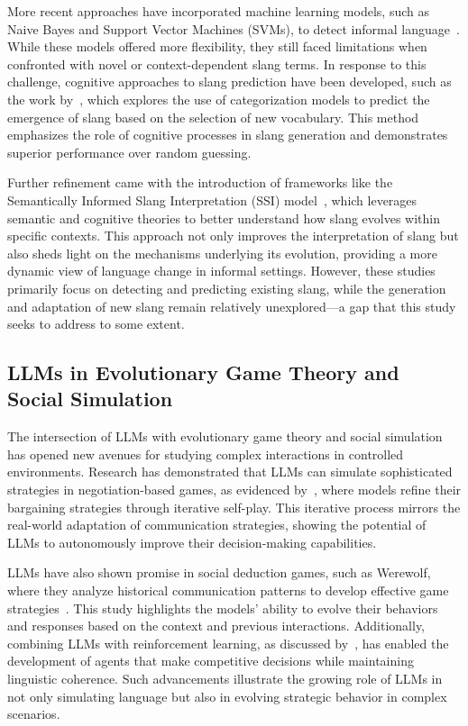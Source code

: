 More recent approaches have incorporated machine learning models, such as Naive Bayes and Support Vector Machines (SVMs), to detect informal language~\cite{10308036,9961254}. While these models offered more flexibility, they still faced limitations when confronted with novel or context-dependent slang terms. In response to this challenge, cognitive approaches to slang prediction have been developed, such as the work by~\cite{sun2019slang}, which explores the use of categorization models to predict the emergence of slang based on the selection of new vocabulary. This method emphasizes the role of cognitive processes in slang generation and demonstrates superior performance over random guessing.

Further refinement came with the introduction of frameworks like the Semantically Informed Slang Interpretation (SSI) model~\cite{sun2022semantically}, which leverages semantic and cognitive theories to better understand how slang evolves within specific contexts. This approach not only improves the interpretation of slang but also sheds light on the mechanisms underlying its evolution, providing a more dynamic view of language change in informal settings. However, these studies primarily focus on detecting and predicting existing slang, while the generation and adaptation of new slang remain relatively unexplored—a gap that this study seeks to address to some extent.

\subsection{LLMs in Evolutionary Game Theory and Social Simulation}
The intersection of LLMs with evolutionary game theory and social simulation has opened new avenues for studying complex interactions in controlled environments. Research has demonstrated that LLMs can simulate sophisticated strategies in negotiation-based games, as evidenced by~\cite{fu2023improving}, where models refine their bargaining strategies through iterative self-play. This iterative process mirrors the real-world adaptation of communication strategies, showing the potential of LLMs to autonomously improve their decision-making capabilities.

LLMs have also shown promise in social deduction games, such as Werewolf, where they analyze historical communication patterns to develop effective game strategies~\cite{xu2023exploring}. This study highlights the models’ ability to evolve their behaviors and responses based on the context and previous interactions. Additionally, combining LLMs with reinforcement learning, as discussed by~\cite{xu2023language}, has enabled the development of agents that make competitive decisions while maintaining linguistic coherence. Such advancements illustrate the growing role of LLMs in not only simulating language but also in evolving strategic behavior in complex scenarios.

